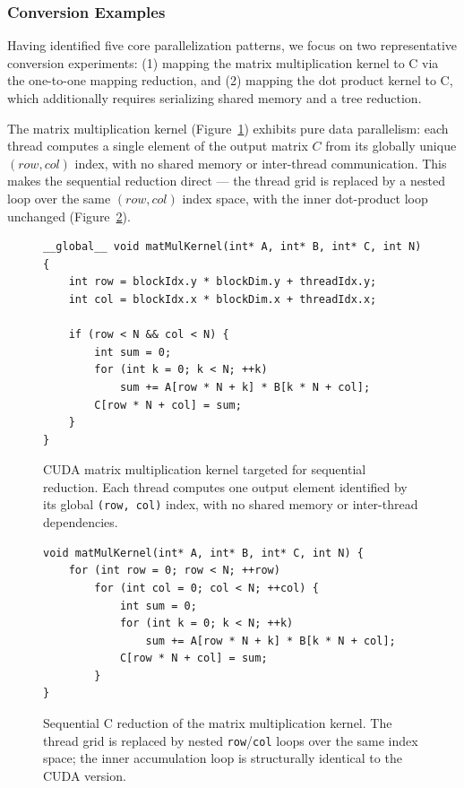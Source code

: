 \documentclass{article}
\begin{document}
\subsubsection{Conversion Examples}

Having identified five core parallelization patterns, we focus on two representative conversion experiments: (1) mapping the matrix multiplication kernel to C via the one-to-one mapping reduction, and (2) mapping the dot product kernel to C, which additionally requires serializing shared memory and a tree reduction.

The matrix multiplication kernel (Figure~\ref{fig:matmul-cuda-conv}) exhibits pure data parallelism: each thread computes a single element of the output matrix $C$ from its globally unique $(row, col)$ index, with no shared memory or inter-thread communication. This makes the sequential reduction direct --- the thread grid is replaced by a nested loop over the same $(row, col)$ index space, with the inner dot-product loop unchanged (Figure~\ref{fig:matmul-c-conv}).

\begin{figure}[H]
\begin{verbatim}
__global__ void matMulKernel(int* A, int* B, int* C, int N) {
    int row = blockIdx.y * blockDim.y + threadIdx.y;
    int col = blockIdx.x * blockDim.x + threadIdx.x;

    if (row < N && col < N) {
        int sum = 0;
        for (int k = 0; k < N; ++k)
            sum += A[row * N + k] * B[k * N + col];
        C[row * N + col] = sum;
    }
}
\end{verbatim}
\caption{CUDA matrix multiplication kernel targeted for sequential reduction. Each thread computes one output element identified by its global \texttt{(row, col)} index, with no shared memory or inter-thread dependencies.}
\label{fig:matmul-cuda-conv}
\end{figure}

\begin{figure}[H]
\begin{verbatim}
void matMulKernel(int* A, int* B, int* C, int N) {
    for (int row = 0; row < N; ++row)
        for (int col = 0; col < N; ++col) {
            int sum = 0;
            for (int k = 0; k < N; ++k)
                sum += A[row * N + k] * B[k * N + col];
            C[row * N + col] = sum;
        }
}
\end{verbatim}
\caption{Sequential C reduction of the matrix multiplication kernel. The thread grid is replaced by nested \texttt{row}/\texttt{col} loops over the same index space; the inner accumulation loop is structurally identical to the CUDA version.}
\label{fig:matmul-c-conv}
\end{figure}
\end{document}
